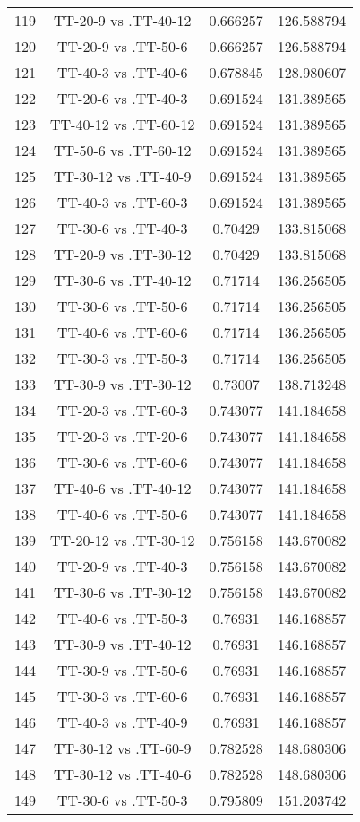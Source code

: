 \documentclass[a4paper,10pt]{article}
\begin{document}
\begin{landscape}
\begin{table}[!htp]
\begin{tabular}{cccc}
119&TT-20-9 vs .TT-40-12&0.666257&126.588794\\
120&TT-20-9 vs .TT-50-6&0.666257&126.588794\\
121&TT-40-3 vs .TT-40-6&0.678845&128.980607\\
122&TT-20-6 vs .TT-40-3&0.691524&131.389565\\
123&TT-40-12 vs .TT-60-12&0.691524&131.389565\\
124&TT-50-6 vs .TT-60-12&0.691524&131.389565\\
125&TT-30-12 vs .TT-40-9&0.691524&131.389565\\
126&TT-40-3 vs .TT-60-3&0.691524&131.389565\\
127&TT-30-6 vs .TT-40-3&0.70429&133.815068\\
128&TT-20-9 vs .TT-30-12&0.70429&133.815068\\
129&TT-30-6 vs .TT-40-12&0.71714&136.256505\\
130&TT-30-6 vs .TT-50-6&0.71714&136.256505\\
131&TT-40-6 vs .TT-60-6&0.71714&136.256505\\
132&TT-30-3 vs .TT-50-3&0.71714&136.256505\\
133&TT-30-9 vs .TT-30-12&0.73007&138.713248\\
134&TT-20-3 vs .TT-60-3&0.743077&141.184658\\
135&TT-20-3 vs .TT-20-6&0.743077&141.184658\\
136&TT-30-6 vs .TT-60-6&0.743077&141.184658\\
137&TT-40-6 vs .TT-40-12&0.743077&141.184658\\
138&TT-40-6 vs .TT-50-6&0.743077&141.184658\\
139&TT-20-12 vs .TT-30-12&0.756158&143.670082\\
140&TT-20-9 vs .TT-40-3&0.756158&143.670082\\
141&TT-30-6 vs .TT-30-12&0.756158&143.670082\\
142&TT-40-6 vs .TT-50-3&0.76931&146.168857\\
143&TT-30-9 vs .TT-40-12&0.76931&146.168857\\
144&TT-30-9 vs .TT-50-6&0.76931&146.168857\\
145&TT-30-3 vs .TT-60-6&0.76931&146.168857\\
146&TT-40-3 vs .TT-40-9&0.76931&146.168857\\
147&TT-30-12 vs .TT-60-9&0.782528&148.680306\\
148&TT-30-12 vs .TT-40-6&0.782528&148.680306\\
149&TT-30-6 vs .TT-50-3&0.795809&151.203742\\

\end{tabular}
\end{table}
\end{landscape}
\end{document}
